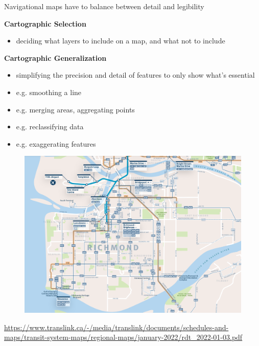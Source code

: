 \documentclass[aspectratio=169]{beamer}
\begin{document}
\begin{frame}
	
	Navigational maps have to balance between detail and legibility
	
	\vspace{6mm}
	
	\textbf{Cartographic Selection}
	
	\begin{itemize}
		\item deciding what layers to include on a map, and what not to include
	\end{itemize}
	
	 \textbf{Cartographic Generalization}
	\begin{itemize}
		\item simplifying the precision and detail of features to only show what's essential
		\item e.g. smoothing a line
		\item e.g. merging areas, aggregating points
		\item e.g. reclassifying data
		\item e.g. exaggerating features
	\end{itemize}
	
\end{frame}




\begin{frame}
	
	\begin{figure}
		\centering
		\includegraphics[width=0.8\linewidth]{images/richmond.png}
	\end{figure}
	
	\tiny \url{https://www.translink.ca/-/media/translink/documents/schedules-and-maps/transit-system-maps/regional-maps/january-2022/rdt_2022-01-03.pdf}
	
\end{frame}
\end{document}
